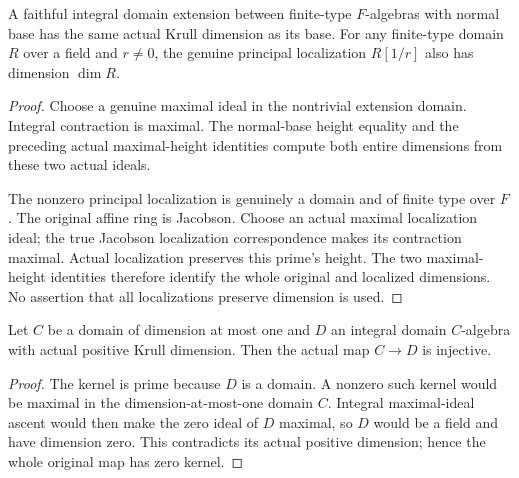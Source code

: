 \begin{theorem}
\label{algebra:affine-domain-dimension-comparison}
\leanok
{}
A faithful integral domain extension between finite-type $F$-algebras
with normal base has the same actual Krull dimension as its base.
For any finite-type domain $R$ over a field and $r\ne0$, the genuine
principal localization $R[1/r]$ also has dimension $\dim R$.
\end{theorem}
\begin{proof}
Choose a genuine maximal ideal in the nontrivial extension domain.
Integral contraction is maximal. The normal-base height equality and
the preceding actual maximal-height identities compute both entire
dimensions from these two actual ideals.

The nonzero principal localization is genuinely a domain and of finite
type over $F$. The original affine ring is Jacobson. Choose an actual
maximal localization ideal; the true Jacobson localization correspondence
makes its contraction maximal. Actual localization preserves this
prime's height. The two maximal-height identities therefore identify
the whole original and localized dimensions. No assertion that all
localizations preserve dimension is used.
\end{proof}

\begin{theorem}
\label{algebra:positive-dimension-integral-injectivity}
\leanok
Let $C$ be a domain of dimension at most one and $D$ an integral domain
$C$-algebra with actual positive Krull dimension. Then the actual map
$C\to D$ is injective.
\end{theorem}
\begin{proof}
The kernel is prime because $D$ is a domain. A nonzero such kernel
would be maximal in the dimension-at-most-one domain $C$. Integral
maximal-ideal ascent would then make the zero ideal of $D$ maximal,
so $D$ would be a field and have dimension zero. This contradicts its
actual positive dimension; hence the whole original map has zero kernel.
\end{proof}

